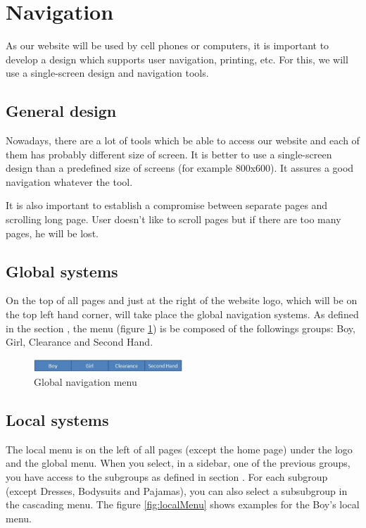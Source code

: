 \section{Navigation}

As our website will be used by cell phones or computers, it is important to develop a design which supports user navigation, printing, etc. For this, we will use a single-screen design and navigation tools.

\subsection{General design}

Nowadays, there are a lot of tools which be able to access our website and each of them has probably different size of screen. It is better to use a single-screen design than a predefined size of screens (for example 800x600). It assures a good navigation whatever the tool. 

It is also important to establish a compromise between separate pages and scrolling long page. User doesn't like to scroll pages but if there are too many pages, he will be lost.


\subsection{Global systems}

On the top of all pages and just at the right of the website logo, which will be on the top left hand corner, will take place the global navigation systems. As defined in the section
, the menu (figure \ref{fig:globalMenu}) is be composed of the followings groups: Boy, Girl, Clearance and Second Hand.

\begin{figure}[h!]
  \centering  
  \includegraphics[width=0.5\textwidth]{Images/globalMenu.jpg}                
  \caption{Global navigation menu}
  \label{fig:globalMenu}
\end{figure}


\subsection{Local systems}
The local menu is on the left of all pages (except the home page) under the logo and the global menu. When you select, in a sidebar, one of the previous groups, you have access to the subgroups as defined in section
. For each subgroup (except Dresses, Bodysuits and Pajamas), you can also select a subsubgroup in the cascading menu. The figure \ref{fig:localMenu} shows examples for the Boy's local menu.

